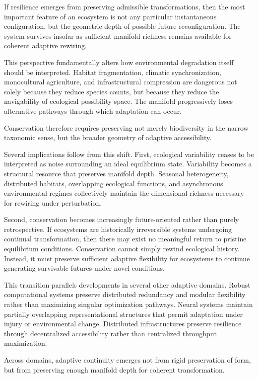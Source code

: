 \documentclass[11pt,a4paper]{article}
\begin{document}
If resilience emerges from preserving admissible transformations, then the most important feature of an ecosystem is not any particular instantaneous configuration, but the geometric depth of possible future reconfiguration. The system survives insofar as sufficient manifold richness remains available for coherent adaptive rewiring.

This perspective fundamentally alters how environmental degradation itself should be interpreted. Habitat fragmentation, climatic synchronization, monocultural agriculture, and infrastructural compression are dangerous not solely because they reduce species counts, but because they reduce the navigability of ecological possibility space. The manifold progressively loses alternative pathways through which adaptation can occur.

Conservation therefore requires preserving not merely biodiversity in the narrow taxonomic sense, but the broader geometry of adaptive accessibility.

Several implications follow from this shift. First, ecological variability ceases to be interpreted as noise surrounding an ideal equilibrium state. Variability becomes a structural resource that preserves manifold depth. Seasonal heterogeneity, distributed habitats, overlapping ecological functions, and asynchronous environmental regimes collectively maintain the dimensional richness necessary for rewiring under perturbation.

Second, conservation becomes increasingly future-oriented rather than purely retrospective. If ecosystems are historically irreversible systems undergoing continual transformation, then there may exist no meaningful return to pristine equilibrium conditions. Conservation cannot simply rewind ecological history. Instead, it must preserve sufficient adaptive flexibility for ecosystems to continue generating survivable futures under novel conditions.

This transition parallels developments in several other adaptive domains. Robust computational systems preserve distributed redundancy and modular flexibility rather than maximizing singular optimization pathways. Neural systems maintain partially overlapping representational structures that permit adaptation under injury or environmental change. Distributed infrastructures preserve resilience through decentralized accessibility rather than centralized throughput maximization.

Across domains, adaptive continuity emerges not from rigid preservation of form, but from preserving enough manifold depth for coherent transformation.
\end{document}
